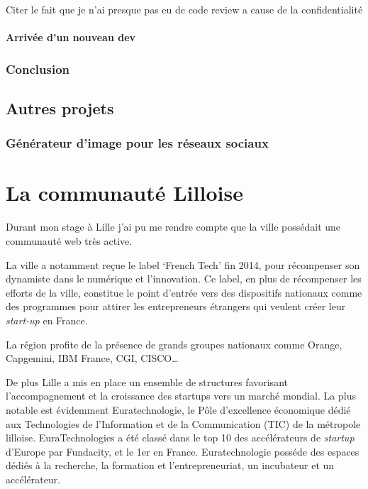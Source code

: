 \documentclass[12pt,a4paper]{article}
\begin{document}
  Citer le fait que je n'ai presque pas eu de code review a cause de la
  confidentialité

  \paragraph{Arrivée d'un nouveau dev}\label{arrivuxe9e-dun-nouveau-dev}

  \subsubsection{Conclusion}\label{conclusion-1}

  \subsection{Autres projets}\label{autres-projets}

  \subsubsection{Générateur d'image pour les réseaux
  sociaux}\label{guxe9nuxe9rateur-dimage-pour-les-ruxe9seaux-sociaux}

  \newpage

  \section{La communauté Lilloise}\label{la-communautuxe9-lilloise}

  Durant mon stage à Lille j'ai pu me rendre compte que la ville possédait
  une communauté web très active.

  \bigskip

  La ville a notamment reçue le label `French Tech' fin 2014, pour
  récompenser son dynamiste dans le numérique et l'innovation. Ce label,
  en plus de récompenser les efforts de la ville, constitue le point
  d'entrée vers des dispositifs nationaux comme des programmes pour
  attirer les entrepreneurs étrangers qui veulent créer leur
  \emph{start-up} en France.

  \bigskip

  La région profite de la présence de grands groupes nationaux comme
  Orange, Capgemini, IBM France, CGI, CISCO\ldots{}

  \bigskip

  De plus Lille a mis en place un ensemble de structures favorisant
  l'accompagnement et la croissance des startups vers un marché mondial.
  La plus notable est évidemment Euratechnologie, le Pôle d'excellence
  économique dédié aux Technologies de l'Information et de la
  Communication (TIC) de la métropole lilloise. EuraTechnologies a été
  classé dans le top 10 des accélérateurs de \emph{startup} d'Europe par
  Fundacity, et le 1er en France. Euratechnologie posséde des espaces
  dédiés à la recherche, la formation et l'entrepreneuriat, un incubateur
  et un accélérateur.
\end{document}
